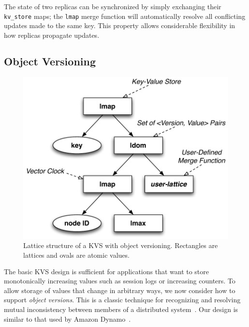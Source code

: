 The state of two replicas can be synchronized by simply exchanging their
\texttt{kv\_store} maps; the \texttt{lmap} merge function will automatically
resolve all conflicting updates made to the same key. This property allows
considerable flexibility in how replicas propagate updates.

\subsection{Object Versioning}
\label{sec:kvs-versions}
\begin{figure}[t]
\centering
\includegraphics[width=0.8\linewidth]{fig/kvs-vc-lattice.pdf}
\caption{Lattice structure of a KVS with object versioning. Rectangles are
  lattices and ovals are atomic values.}
\label{fig:kvs-vc-lattices}
\end{figure}

The basic KVS design is sufficient for applications that want to store
monotonically increasing values such as session logs or increasing counters. To
allow storage of values that change in arbitrary ways, we now consider how to
support \emph{object versions}. This is a classic technique for recognizing and resolving
mutual inconsistency between members of a distributed system~\cite{Parker1983}.
Our design is similar to that used by Amazon Dynamo~\cite{DeCandia2007}.

